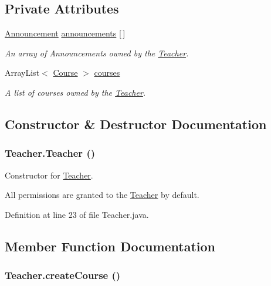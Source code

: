 \subsection*{Private Attributes}
\begin{CompactItemize}
\item 
\hyperlink{classAnnouncement}{Announcement} \hyperlink{classTeacher_f3509aec422e572e7f3bf9c99f4081a1}{announcements} \mbox{[}$\,$\mbox{]}
\begin{CompactList}\small\item\em An array of Announcements owned by the \hyperlink{classTeacher}{Teacher}. \item\end{CompactList}\item 
ArrayList$<$ \hyperlink{classCourse}{Course} $>$ \hyperlink{classTeacher_ee7404da23833c44e12c5c460f480931}{courses}
\begin{CompactList}\small\item\em A list of courses owned by the \hyperlink{classTeacher}{Teacher}. \item\end{CompactList}\end{CompactItemize}


\subsection{Constructor \& Destructor Documentation}
\hypertarget{classTeacher_f3008b8968c2cc6edc1c742cb7363c6b}{
\subsubsection{\setlength{\rightskip}{0pt plus 5cm}Teacher.Teacher ()}}
\label{classTeacher_f3008b8968c2cc6edc1c742cb7363c6b}


Constructor for \hyperlink{classTeacher}{Teacher}. 

All permissions are granted to the \hyperlink{classTeacher}{Teacher} by default. 

Definition at line 23 of file Teacher.java.

\subsection{Member Function Documentation}
\hypertarget{classTeacher_99eda3ecbd084e16e1c3aee44f15b7fb}{
\subsubsection{ Teacher.createCourse ()}}
\label{classTeacher_99eda3ecbd084e16e1c3aee44f15b7fb}



